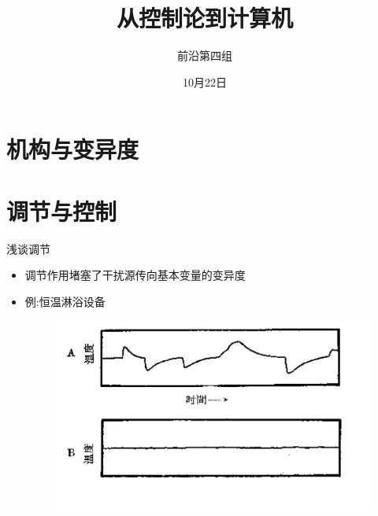 \documentclass[12pt,AutoFakeBold,aspectratio=43,mathserif]{beamer}
\title{从控制论到计算机}
\author{前沿第四组}
\date{10月22日}
\begin{document}
    \begin{frame}
        \titlepage
    
    \end{frame}
    
    \section{机构与变异度}

    \section{调节与控制}

    \begin{frame}{浅谈调节}
        \begin{itemize}
                \item 调节作用堵塞了干扰源传向基本变量的变异度
                \item 例:恒温淋浴设备
               \begin{figure}[H]
                \centering
                \includegraphics[width=.6\textwidth]{figures/pic1.png}
                \end{figure}
        \end{itemize}
        
    \end{frame}
\end{document}
